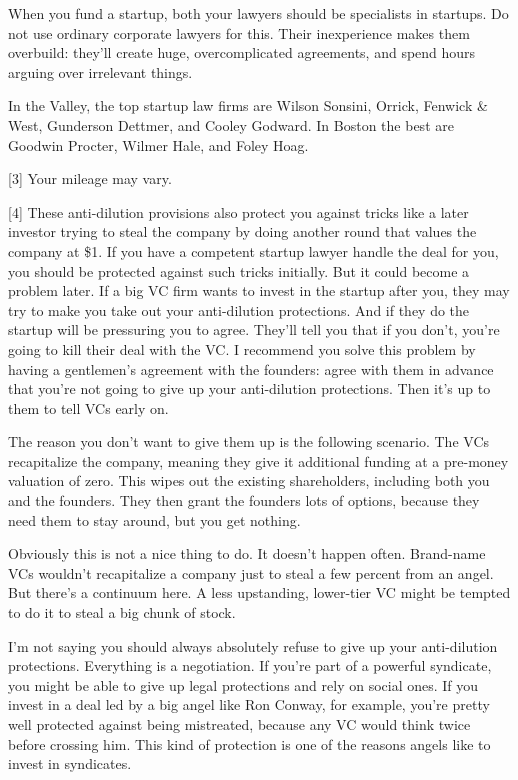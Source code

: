 When you fund a startup, both your lawyers should be specialists in
startups. Do not use ordinary corporate lawyers for this. Their
inexperience makes them overbuild: they'll create huge, overcomplicated
agreements, and spend hours arguing over irrelevant things.

In the Valley, the top startup law firms are Wilson Sonsini, Orrick,
Fenwick \& West, Gunderson Dettmer, and Cooley Godward. In Boston the
best are Goodwin Procter, Wilmer Hale, and Foley Hoag.

{[}3{]} Your mileage may vary.

{[}4{]} These anti-dilution provisions also protect you against tricks
like a later investor trying to steal the company by doing another round
that values the company at \$1. If you have a competent startup lawyer
handle the deal for you, you should be protected against such tricks
initially. But it could become a problem later. If a big VC firm wants
to invest in the startup after you, they may try to make you take out
your anti-dilution protections. And if they do the startup will be
pressuring you to agree. They'll tell you that if you don't, you're
going to kill their deal with the VC. I recommend you solve this problem
by having a gentlemen's agreement with the founders: agree with them in
advance that you're not going to give up your anti-dilution protections.
Then it's up to them to tell VCs early on.

The reason you don't want to give them up is the following scenario. The
VCs recapitalize the company, meaning they give it additional funding at
a pre-money valuation of zero. This wipes out the existing shareholders,
including both you and the founders. They then grant the founders lots
of options, because they need them to stay around, but you get nothing.

Obviously this is not a nice thing to do. It doesn't happen often.
Brand-name VCs wouldn't recapitalize a company just to steal a few
percent from an angel. But there's a continuum here. A less upstanding,
lower-tier VC might be tempted to do it to steal a big chunk of stock.

I'm not saying you should always absolutely refuse to give up your
anti-dilution protections. Everything is a negotiation. If you're part
of a powerful syndicate, you might be able to give up legal protections
and rely on social ones. If you invest in a deal led by a big angel like
Ron Conway, for example, you're pretty well protected against being
mistreated, because any VC would think twice before crossing him. This
kind of protection is one of the reasons angels like to invest in
syndicates.

